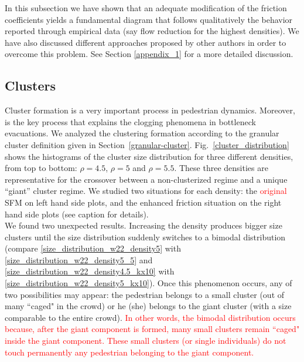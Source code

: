 \documentclass[preprint,12pt]{elsarticle}
\begin{document}
In this subsection we have shown that an adequate modification of the friction coefficients yields a fundamental diagram that follows qualitatively the behavior reported through empirical data (say flow reduction for the highest densities). We have also discussed different approaches proposed by other authors in order to overcome this problem. See Section \ref{appendix_1} for a more detailed discussion.\\

\subsection{\label{clusters}Clusters}

Cluster formation is a very important process in pedestrian dynamics. Moreover, is the key process that explains the clogging phenomena in bottleneck evacuations. We analyzed the clustering formation according to the granular cluster definition given in Section~\ref{granular-cluster}. Fig.~\ref{cluster_distribution} shows the histograms of the cluster size distribution for three different densities, from top to bottom: $\rho=4.5$, $\rho=5$ and $\rho=5.5$. These three
densities are representative for the crossover between
a non-clusterized regime and a unique “giant” cluster
regime. We studied two situations for each density: the
\textcolor{red}{original} SFM on left hand side plots, and the enhanced
friction situation on the right hand side plots (see
caption for details).\\

We found two unexpected results. Increasing the density produces bigger size clusters until the size distribution suddenly switches to a bimodal distribution (compare \ref{size_distribution_w22_density5} with \ref{size_distribution_w22_density5_5} and \ref{size_distribution_w22_density4.5_kx10} with \ref{size_distribution_w22_density5_kx10}). Once
this phenomenon occurs, any of two possibilities may
appear: the pedestrian belongs to a small cluster (out
of many ``caged" in the crowd) or he (she) belongs to the
giant cluster (with a size comparable to the entire crowd).
\textcolor{red}{In other words, the bimodal distribution occurs because,
after the giant component is formed, many small clusters remain ``caged" 
inside the giant component. These small clusters (or single individuals)
do not touch permanently any pedestrian belonging to the giant component.} \\
\end{document}
